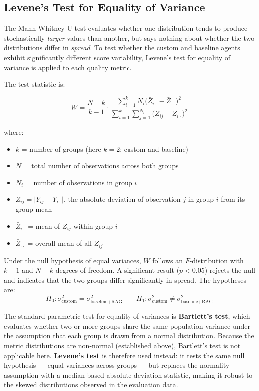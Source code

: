 \subsection{Levene's Test for Equality of Variance}

The Mann-Whitney U test evaluates whether one distribution tends to produce
stochastically \emph{larger} values than another, but says nothing about whether the
two distributions differ in \emph{spread}. To test whether the custom and baseline
agents exhibit significantly different score variability, Levene's test for equality of
variance \cite{levene1960} is applied to each quality metric.

The test statistic is:

\begin{equation}
    W = \frac{N - k}{k - 1} \cdot
        \frac{\displaystyle\sum_{i=1}^{k} N_i \bigl(\bar{Z}_{i\cdot} - \bar{Z}_{\cdot\cdot}\bigr)^2}
             {\displaystyle\sum_{i=1}^{k} \sum_{j=1}^{N_i} \bigl(Z_{ij} - \bar{Z}_{i\cdot}\bigr)^2}
    \label{eq:levene}
\end{equation}

\noindent where:
\begin{itemize}
    \item $k$ = number of groups (here $k = 2$: custom and baseline)
    \item $N$ = total number of observations across both groups
    \item $N_i$ = number of observations in group $i$
    \item $Z_{ij} = \lvert Y_{ij} - \bar{Y}_{i\cdot} \rvert$, the absolute deviation of
          observation $j$ in group $i$ from its group mean
    \item $\bar{Z}_{i\cdot}$ = mean of $Z_{ij}$ within group $i$
    \item $\bar{Z}_{\cdot\cdot}$ = overall mean of all $Z_{ij}$
\end{itemize}

Under the null hypothesis of equal variances, $W$ follows an $F$-distribution with
$k - 1$ and $N - k$ degrees of freedom. A significant result ($p < 0.05$) rejects
the null and indicates that the two groups differ significantly in spread.
The hypotheses are:
\[
H_0: \sigma^2_{\text{custom}} = \sigma^2_{\text{baseline+RAG}}
\qquad
H_1: \sigma^2_{\text{custom}} \neq \sigma^2_{\text{baseline+RAG}}
\]

The standard parametric test for equality of variances is \textbf{Bartlett's test}, which
evaluates whether two or more groups share the same population variance under the
assumption that each group is drawn from a normal distribution. Because the metric
distributions are non-normal (established above), Bartlett's test is not applicable here.
\textbf{Levene's test} \cite{levene1960} is therefore used instead: it tests the same
null hypothesis --- equal variances across groups --- but replaces the normality assumption
with a median-based absolute-deviation statistic, making it robust to the skewed
distributions observed in the evaluation data.

